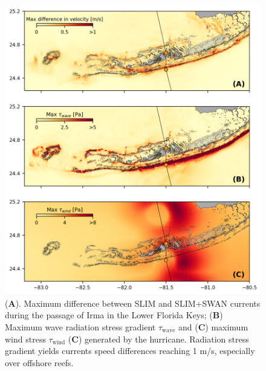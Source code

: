 \documentclass[preprint,12pt,authoryear]{elsarticle}
\begin{document}
\begin{figure}
    \centering
    \includegraphics[width=\textwidth]{figures/max_diff_new.png}
    \caption{(\textbf{A}). Maximum difference between SLIM and SLIM+SWAN currents during the passage of Irma in the Lower Florida Keys; (\textbf{B}) Maximum wave radiation stress gradient {\boldmath$\tau$}$_\text{wave}$ and (\textbf{C}) maximum wind stress {\boldmath$\tau$}$_\text{wind}$ (\textbf{C}) generated by the hurricane. Radiation stress gradient yields currents speed differences reaching 1 m/s, especially over offshore reefs.}
    \label{fig:diff}
\end{figure}
\end{document}
